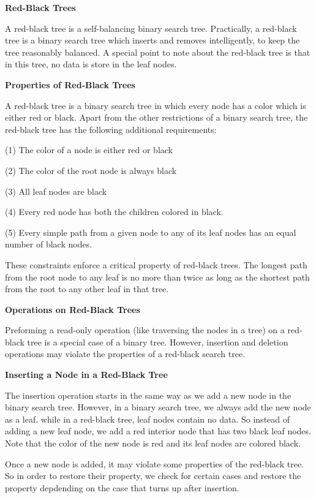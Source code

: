 \filbreak
\vskip 1cm
{\bf Red-Black Trees}

\vskip 1mm
A red-black tree is a self-balancing binary search tree. Practically, a red-black tree is a binary search tree which inserts and removes intelligently, to keep the tree reasonably balanced. A special point to note about the red-black tree is that in this tree, no data is store in the leaf nodes.

\filbreak
\vskip 1cm
{\bf Properties of Red-Black Trees}

\vskip 1mm
A red-black tree is a binary search tree in which every node has a color which is either red or black. Apart from the other restrictions of a binary search tree, the red-black tree has the following additional requirements:

\qquad(1) The color of a node is either red or black

\vskip 3mm
\qquad(2) The color of the root node is always black

\vskip 3mm
\qquad(3) All leaf nodes are black

\vskip 3mm
\qquad(4) Every red node has both the children colored in black.

\vskip 3mm
\qquad(5) Every simple path from a given node to any of its leaf nodes has an equal number of black nodes.

\vskip 2mm
These constraints enforce a critical property of red-black trees. The longest path from the root node to any leaf is no more than twice as long as the shortest path from the root to any other leaf in that tree.

\filbreak
\vskip 1cm
{\bf Operations on Red-Black Trees}

\vskip 1mm
Preforming a read-only operation (like traversing the nodes in a tree) on a red-black tree is a special case of a binary tree. However, insertion and deletion operations may violate the properties of a red-black search tree.

\vskip 3mm
{\bf Inserting a Node in a Red-Black Tree}

\vskip 1mm
The insertion operation starts in the same way as we add a new node in the binary search tree. However, in a binary search tree, we always add the new node as a leaf. while in a red-black tree, leaf nodes contain no data. So instead of adding a new leaf node, we add a red interior node that has two black leaf nodes. Note that the color of the new node is red and its leaf nodes are colored black.

\vskip 1mm
Once a new node is added, it may violate some properties of the red-black tree. So in order to restore their property, we check for certain cases and restore the property depdending on the case that turns up after insertion.

